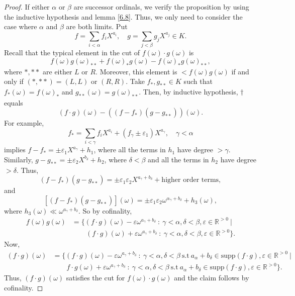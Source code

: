 \begin{proof} If either $\alpha$ or $\beta$ are successor ordinals, we verify the proposition by using the inductive hypothesis and lemma \eqref{6.8}.  Thus, we only need to consider the case where $\alpha$ and $\beta$ are both limits.  Put 
$$f=\sum_{i<\alpha}f_i X^{a_i}, \quad g=\sum_{j<\beta}g_jX^{a_j}\in K.$$
Recall that the typical element in the cut of $f(\omega)\cdot g(\omega)$ is 
\begin{equation} f(\omega)g(\omega)_{**} + f(\omega)_{*}g(\omega)-f(\omega)_*g(\omega)_{**}, \tag{$\dagger$} \end{equation}
where $*, **$ are either $L$ or $R$.  Moreover, this element is $<f(\omega)g(\omega)$ if and only if $(*, **)=(L, L)$ or $(R, R)$.  Take $f_*, g_{**}\in K$ such that $f_*(\omega)= f(\omega)_*$ and $g_{**}(\omega)=g(\omega)_{**}$.  Then, by inductive hypothesis, $\dagger$ equals
$$(f\cdot g)(\omega) -((f-f_*)(g-g_{**}))(\omega).$$
For example, 
$$f_*=\sum_{i<\gamma}f_iX^{a_i} + (f_\gamma\pm \varepsilon_1)X^{a_\gamma}, \quad \gamma<\alpha$$
implies $f-f_*= \pm \varepsilon_1X^{a_\gamma}+h_1$, where all the terms in $h_1$ have degree $>\gamma$. Similarly, $g-g_{**}= \pm \varepsilon_2X^{b_\delta} + h_2$, where $\delta <\beta$ and all the terms in $h_2$ have degree $>\delta$.  Thus,
$$(f-f_*)(g-g_{**})= \pm \varepsilon_1\varepsilon_2 X^{a_\gamma + b_\delta} + \text{higher order terms},$$
and
$$[(f-f_*)(g-g_{**})](\omega) = \pm \varepsilon_1\varepsilon_2\omega^{\alpha_\gamma+b_\delta} + h_3(\omega),$$
where $h_3(\omega)\ll\omega^{a_\gamma+b_\delta}$.  So by cofinality,
\begin{align*}f(\omega)g(\omega) &=\{ (f\cdot g)(\omega)-\varepsilon\omega^{a_\gamma+b_\delta} \ : \ \gamma<\alpha, \delta < \beta, \varepsilon\in \mathds{R}^{>0} \ | \\  
 &\qquad (f\cdot g)(\omega)+\varepsilon\omega^{a_\gamma+b_\delta} \ : \ \gamma<\alpha, \delta < \beta, \varepsilon\in \mathds{R}^{>0} \}. \end{align*}
 Now,
\begin{align*}(f\cdot g)(\omega) &=\{ (f\cdot g)(\omega)-\varepsilon\omega^{a_\gamma+b_\delta} \ : \ \gamma<\alpha, \delta < \beta \ \text{s.t} \ a_\alpha+b_\delta \in \text{supp}(f\cdot g), \varepsilon\in \mathds{R}^{>0} \ | \\  
 &\qquad f\cdot g(\omega)+\varepsilon\omega^{a_\gamma+b_\delta} \ : \ \gamma<\alpha, \delta < \beta \ \text{s.t} \ a_\alpha+b_\delta \in \text{supp}(f\cdot g),\varepsilon\in \mathds{R}^{>0} \}. \end{align*}
Thus, $(f\cdot g)(\omega)$ satisfies the cut for $f(\omega)\cdot g(\omega)$ and the claim follows by cofinality.  

\end{proof}

